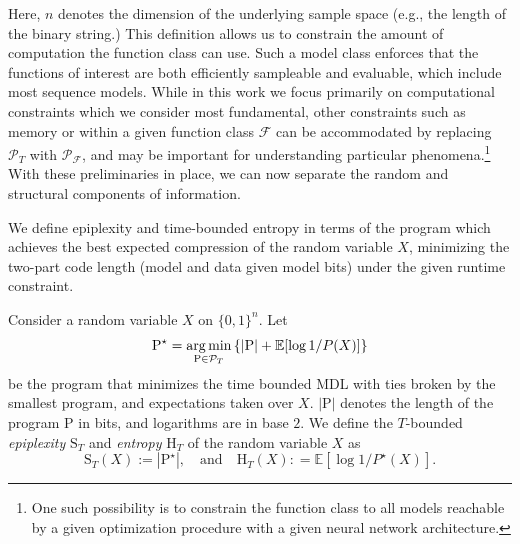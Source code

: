 \documentclass[twoside]{article}
\DeclareMathOperator*{\argmin}{arg\,min}
\newcommand{\E}{\mathbb{E}}
\begin{document}
%
%
%
%
%
%
%
%
Here, $n$ denotes the dimension of the underlying sample space (e.g., the length of the binary string.) %
This definition allows us to constrain the amount of computation the function class can use. %
Such a model class enforces that the functions of interest are both efficiently sampleable and evaluable, which include most sequence models.
While in this work we focus primarily on computational constraints which we consider most fundamental, other constraints such as memory or within a given function class $\mathcal{F}$ can be accommodated by replacing $\mathcal{P}_T$ with $\mathcal{P}_{\mathcal{F}}$, and may be important for understanding particular phenomena.\footnote{One such possibility is to constrain the function class to all models reachable by a given optimization procedure with a given neural network architecture.} With these preliminaries in place, we can now separate the random and structural components of information.
%
%


%
%

We define epiplexity and time-bounded entropy in terms of the program which achieves the best expected compression of the random variable $X$, minimizing the two-part code length (model and data given model bits) under the given runtime constraint. 

\begin{remarkbox}{}
\begin{definition}
\label{def:epiplexity}
Consider a random variable $X$ on $\{0,1\}^n$. Let
\begin{equation}
\mathrm{P^\star} = \argmin_{\mathrm{P}\in \mathcal P_T}\qty{|\mathrm{P}| + \E[\log 1/P(X)]}
\end{equation}
be the program that minimizes the time bounded MDL with ties broken by the smallest program, and expectations taken over $X$. $|\mathrm{P}|$ denotes the length of the program $\mathrm{P}$ in bits, and logarithms are in base $2$. We define the $T$-bounded \emph{epiplexity} $\mathrm{S}_T$ and \emph{entropy} $\mathrm{H}_T$ of the random variable $X$ as  
\begin{equation}
    \mathrm{S}_T(X):=|\mathrm{P}^\star|, \quad \text{and} \quad  \mathrm{H}_T(X): = \E[\log 1/P^\star(X)].
\end{equation}
\end{definition}
\normalsize
\end{remarkbox}

\vspace{5mm}
\end{document}
